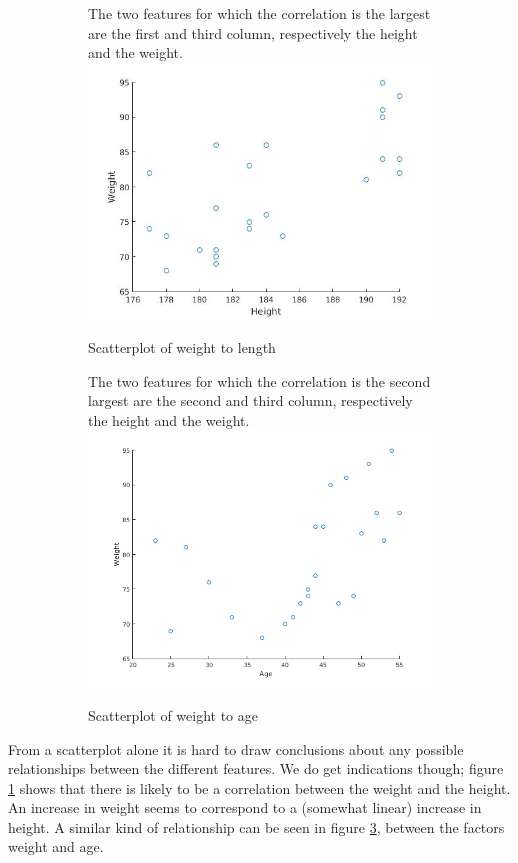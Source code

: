 \documentclass{article}
\begin{document}
\begin{figure}[H]
	\centering

	\begin{subfigure}[b]{.45\linewidth}
		The two features for which the correlation is the largest are the first and third column, respectively the height and the weight.
		\centering
		\includegraphics[width=\columnwidth]{plot_1_3_a.jpg}
		\caption{Scatterplot of weight to length}
		\label{fig1.3a}
	\end{subfigure}%
	\quad
	\begin{subfigure}[b]{.45\linewidth}
		The two features for which the correlation is the second largest are the second and third column, respectively the height and the weight.
		\centering
		\includegraphics[width=\linewidth]{plot_1_3_b.png}
		\caption{Scatterplot of weight to age}
		\label{fig1.3b}
	\end{subfigure}
	\caption{}
\end{figure}
From a scatterplot alone it is hard to draw conclusions about any possible relationships between the different features. 
We do get indications though; figure \ref{fig1.3a} shows that there is likely to be a correlation between the weight and the height.
An increase in weight seems to correspond to a (somewhat linear) increase in height. 
A similar kind of relationship can be seen in figure \ref{fig1.3b}, between the factors weight and age.
\end{document}
